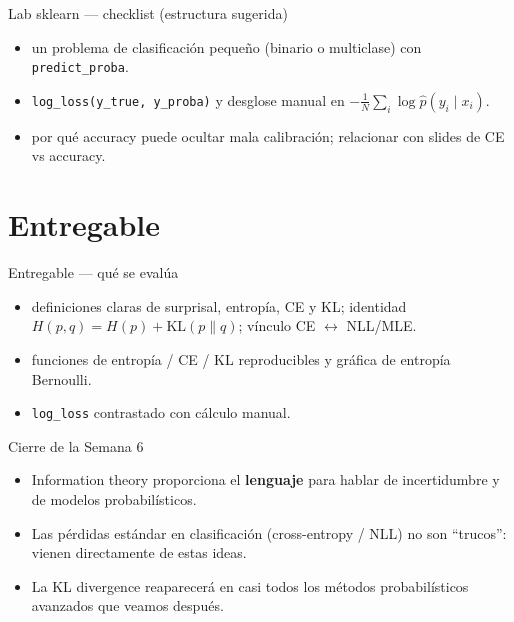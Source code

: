 \begin{frame}{Lab sklearn — checklist (estructura sugerida)}
\small
\begin{itemize}
  \item {} un problema de clasificación pequeño (binario o multiclase) con \texttt{predict\_proba}.
  \item {} \texttt{log\_loss(y\_true, y\_proba)} y desglose manual en \(-\frac{1}{N}\sum_i \log \hat p(y_i\mid x_i)\).
  \item {} por qué accuracy puede ocultar mala calibración; relacionar con slides de CE vs accuracy.
\end{itemize}
\end{frame}

\section[Entregable]{Entregable\label{sec:entregable-w06}}

\begin{frame}{Entregable — qué se evalúa}
\begin{itemize}
  \item {} definiciones claras de surprisal, entropía, CE y KL; identidad \(H(p,q)=H(p)+\mathrm{KL}(p\|q)\); vínculo CE \(\leftrightarrow\) NLL/MLE.
  \item {} funciones de entropía / CE / KL reproducibles y gráfica de entropía Bernoulli.
  \item {} \texttt{log\_loss} contrastado con cálculo manual.
\end{itemize}
\end{frame}

\begin{frame}{Cierre de la Semana 6}
\begin{itemize}
  \item Information theory proporciona el \textbf{lenguaje} para hablar de incertidumbre y de modelos probabilísticos.
  \item Las pérdidas estándar en clasificación (cross-entropy / NLL) no son “trucos”: vienen directamente de estas ideas.
  \item La KL divergence reaparecerá en casi todos los métodos probabilísticos avanzados que veamos después.
\end{itemize}
\end{frame}